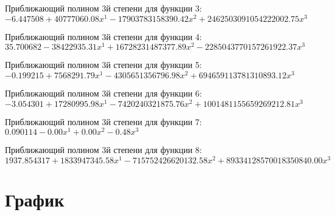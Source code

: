 \documentclass[a4paper,14pt]{extarticle}
\begin{document}
Приближающий полином 3й степени для функции 3: $-6.447508 + 40777060.08x^1 - 17903783158390.42x^2 + 2462503091054222002.75x^3$

Приближающий полином 3й степени для функции 4: $35.700682 - 38422935.31x^1 + 16728231487377.89x^2 - 2285043770157261922.37x^3$

Приближающий полином 3й степени для функции 5: $-0.199215 + 7568291.79x^1 - 4305651356796.98x^2 + 694659113781310893.12x^3$

Приближающий полином 3й степени для функции 6: $-3.054301 + 17280995.98x^1 - 7420240321875.76x^2 + 1001481155659269212.81x^3$

Приближающий полином 3й степени для функции 7: $0.090114 - 0.00x^1 + 0.00x^2 - 0.48x^3$

Приближающий полином 3й степени для функции 8: $1937.854317 + 1833947345.58x^1 - 715752426620132.58x^2 + 89334128570018350840.00x^3$

\section{График}
\end{document}
